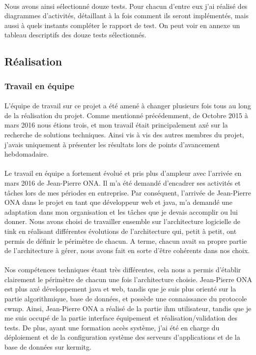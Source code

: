 \documentclass[12pt,a4paper]{report}
\begin{document}
\paragraph*{}Nous avons ainsi sélectionné douze tests. Pour chacun d'entre eux j'ai réalisé des diagrammes d'activités, détaillant à la fois comment ils seront implémentés, mais aussi à quels instants compléter le rapport de test. On peut voir en annexe un tableau descriptifs des douze tests sélectionnés. \\


\subsection{Réalisation}
\subsubsection{Travail en équipe}
\paragraph*{}L'équipe de travail sur ce projet a été amené à changer plusieurs fois tous au long de la réalisation du projet. Comme mentionné précédemment, de Octobre 2015 à mars 2016 nous étions trois, et mon travail était principalement axé sur la recherche de solutions techniques. Ainsi vis à vis des autres membres du projet, j'avais uniquement à présenter les résultats lors de points d'avancement hebdomadaire.
\paragraph*{}Le travail en équipe a fortement évolué et pris plus d'ampleur avec l'arrivée en mars 2016 de Jean-Pierre ONA. Il m’a été demandé d’encadrer ses activités et tâches lors de mes périodes en entreprise. Par conséquent, l’arrivée de Jean-Pierre ONA dans le projet en tant que développeur web et java, m’a demandé une adaptation dans mon organisation et les tâches que je devais accomplir ou lui donner. Nous avons choisi de travailler ensemble sur l’architecture logicielle de \gls{tink} en réalisant différentes évolutions de l’architecture qui, petit à petit, ont permis de définir le périmètre de chacun. A terme, chacun avait sa propre partie de l’architecture à
gérer, nous avons fait en sorte d’être cohérents dans nos choix.
\paragraph*{}Nos compétences techniques étant très différentes, cela nous a permis
d’établir clairement le périmètre de chacun une fois l’architecture choisie. Jean-Pierre ONA est plus axé développement java et web, tandis que je suis plus orienté sur la partie algorithmique, base de données, et possède une connaissance du protocole \gls{cwmp}. Ainsi, Jean-Pierre ONA a réalisé de la partie \gls{ihm} utilisateur, tandis que je me suis occupé de la partie interface équipement et réalisation/validation des tests. De plus, ayant une formation accès système, j’ai été en charge du déploiement et de la configuration système des serveurs d’applications et de la base de données sur \gls{kermitg}.
\end{document}
